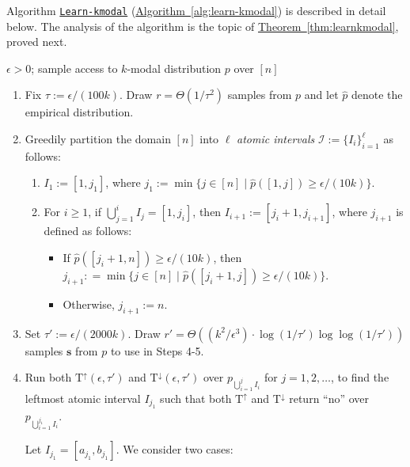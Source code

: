 \documentclass[10pt]{article}
\theoremstyle{definition}
\numberwithin{equation}{section}
\newcommand{\expref}[2]{\texorpdfstring{\hyperref[#2]{#1~\ref{#2}}}{#1~\ref{#2}}}
\newcommand{\algorithml}[1]{{\normalfont\texttt{#1}}}
\newcommand{\eps}{\epsilon}
\newcommand{\wh}[1]{{\widehat{#1}}}
\newcommand{\TND}{{\mathrm{T^{\uparrow}}}}
\newcommand{\TNI}{{\mathrm{T^{\downarrow}}}}
\begin{document}
Algorithm \hyperref[alg:learn-kmodal]{\algorithml{Learn-kmodal}} (\expref{Algorithm}{alg:learn-kmodal})
%
%
%
is described in detail below.
%
%
%
The analysis of the algorithm is the topic of
\expref{Theorem}{thm:learnkmodal}, proved next.
%

\begin{algorithm}
\medskip

 $\eps> 0$; sample access to $k$-modal
distribution $p$ over $[n]$

\smallskip

\begin{enumerate}

\item Fix $\tau:=\eps/(100k)$. Draw $ r = \Theta(1/\tau^2)$ samples from $p$ and let $\wh{p}$ denote the empirical distribution.


\item Greedily partition the domain $[n]$ into $\ell$ \emph{atomic intervals} $\mathcal{I}:= \{I_i\}_{i=1}^{\ell}$ as follows:
          \begin{enumerate}
          \item[(a) ]$I_1 := [1, j_1]$, where $j_1 := \min\{ j \in [n] \mid \wh{p}([1,j]) \geq \eps/(10k)\}$.
           \item[(b)] For $i \geq 1$, if $\bigcup_{j=1}^i I_j = [1, j_i]$, then $I_{i+1}:=[j_i+1, j_{i+1}]$, where
           $j_{i+1}$ is defined as follows: 
           \begin{itemize}
           \item If $\wh{p}([j_i+1, n]) \geq \eps/(10k)$, then $j_{i+1}: = \min\{ j \in [n] \mid \wh{p}([j_{i}+1, j]) \geq \eps/(10k)\}${.}
           \item Otherwise, $j_{i+1} := n$.
           \end{itemize}           
          \end{enumerate}


\item  Set $\tau' := \eps/(2000k)$.
Draw $r' = \Theta(({k^2} / \eps^3) \cdot \log(1/\tau') \log\log(1/\tau'))$ samples
$\mathbf{s}$ from $p$ to use in Steps 4-5.


\item  Run both $\TND(\eps,\tau')$ and $\TNI(\eps,\tau')$ over $p_{\bigcup_{i=1}^{j} I_i}$ for $j=1,2,\ldots$, to find
the leftmost atomic interval $I_{j_1}$ such that both $\TND$ and $\TNI$ return ``no'' over $p_{\bigcup_{i=1}^{j_1} I_i}$.

Let $I_{j_1} = [a_{j_1},b_{j_1}]$.  We consider two cases:


\end{enumerate}
\end{algorithm}
\end{document}
